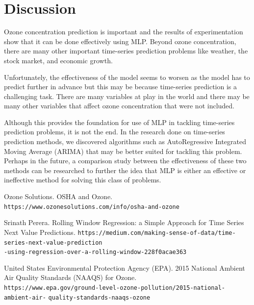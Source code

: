 \documentclass{article}
\begin{document}
\section{Discussion}
Ozone concentration prediction is important and the results of experimentation show that it can be done effectively using MLP. Beyond ozone concentration, there are many other important time-series prediction problems like weather, the stock market, and economic growth.

Unfortunately, the effectiveness of the model seems to worsen as the model has to predict further in advance but this may be because time-series prediction is a challenging task. There are many variables at play in the world and there may be many other variables that affect ozone concentration that were not included.

Although this provides the foundation for use of MLP in tackling time-series prediction problems, it is not the end. In the research done on time-series prediction methods, we discovered algorithms such as AutoRegressive Integrated Moving Average (ARIMA) that may be better suited for tackling this problem. Perhaps in the future, a comparison study between the effectiveness of these two methods can be researched to further the idea that MLP is either an effective or ineffective method for solving this class of problems.

\begin{thebibliography}{9}
    Ozone Solutions. OSHA and Ozone. \texttt{https://www.ozonesolutions.com/info/osha-and-ozone}

    Srinath Perera. Rolling Window Regression: a Simple Approach for Time Series Next Value Predictions.
    \texttt{https://medium.com/making-sense-of-data/time-series-next-value-prediction} \\
    \texttt{-using-regression-over-a-rolling-window-228f0acae363}

    United States Environmental Protection Agency (EPA). 2015 National Ambient Air Quality Standards (NAAQS) for Ozone. \\
    \texttt{https://www.epa.gov/ground-level-ozone-pollution/2015-national-ambient-air-}
    \texttt{quality-standards-naaqs-ozone}
\end{thebibliography}
\end{document}
